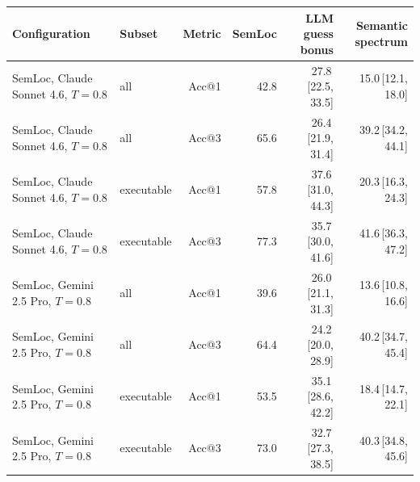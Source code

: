 \begin{tabular}{llrrrr}
\toprule
Configuration & Subset & Metric & SemLoc & LLM guess bonus & Semantic spectrum \\
\midrule
SemLoc, Claude Sonnet 4.6, $T{=}0.8$ & all & Acc@1 & 42.8 & 27.8{\scriptsize\,[22.5, 33.5]} & 15.0{\scriptsize\,[12.1, 18.0]} \\
SemLoc, Claude Sonnet 4.6, $T{=}0.8$ & all & Acc@3 & 65.6 & 26.4{\scriptsize\,[21.9, 31.4]} & 39.2{\scriptsize\,[34.2, 44.1]} \\
SemLoc, Claude Sonnet 4.6, $T{=}0.8$ & executable & Acc@1 & 57.8 & 37.6{\scriptsize\,[31.0, 44.3]} & 20.3{\scriptsize\,[16.3, 24.3]} \\
SemLoc, Claude Sonnet 4.6, $T{=}0.8$ & executable & Acc@3 & 77.3 & 35.7{\scriptsize\,[30.0, 41.6]} & 41.6{\scriptsize\,[36.3, 47.2]} \\
SemLoc, Gemini 2.5 Pro, $T{=}0.8$ & all & Acc@1 & 39.6 & 26.0{\scriptsize\,[21.1, 31.3]} & 13.6{\scriptsize\,[10.8, 16.6]} \\
SemLoc, Gemini 2.5 Pro, $T{=}0.8$ & all & Acc@3 & 64.4 & 24.2{\scriptsize\,[20.0, 28.9]} & 40.2{\scriptsize\,[34.7, 45.4]} \\
SemLoc, Gemini 2.5 Pro, $T{=}0.8$ & executable & Acc@1 & 53.5 & 35.1{\scriptsize\,[28.6, 42.2]} & 18.4{\scriptsize\,[14.7, 22.1]} \\
SemLoc, Gemini 2.5 Pro, $T{=}0.8$ & executable & Acc@3 & 73.0 & 32.7{\scriptsize\,[27.3, 38.5]} & 40.3{\scriptsize\,[34.8, 45.6]} \\
\bottomrule
\end{tabular}
